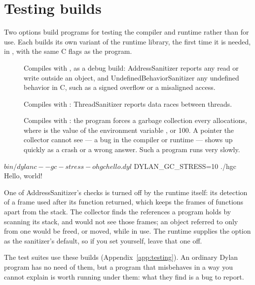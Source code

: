 \section{Testing builds}\label{sec:dylanc-testing-builds}

Two options build programs for testing the compiler and runtime rather
than for use. Each builds its own variant of the runtime library, the
first time it is needed, in ,
with the same C flags as the program.

\begin{description}
\item[] Compiles with , as a
  debug build: AddressSanitizer reports any read or write outside an
  object, and UndefinedBehaviorSanitizer any undefined behavior in C,
  such as a signed overflow or a misaligned access.
\item[] Compiles with : ThreadSanitizer reports data races
  between threads.
\item[] Compiles with :
  the program forces a garbage collection every  allocations,
  where  is the value of the environment variable
  , or 100. A pointer the collector cannot see
  --- a bug in the compiler or runtime --- shows up quickly as a crash or
  a wrong answer. Such a program runs very slowly.
\end{description}

\begin{shell}
$ bin/dylanc --gc-stress -o hgc hello.dyl
$ DYLAN_GC_STRESS=10 ./hgc
Hello, world!
\end{shell}

One of AddressSanitizer's checks is turned off by the runtime itself: its
detection of a frame used after its function returned, which keeps the
frames of functions apart from the stack. The collector finds the
references a program holds by scanning its stack, and would not see those
frames; an object referred to only from one would be freed, or moved,
while in use. The runtime supplies the option
 as the sanitizer's default,
so if you set  yourself, leave that one off.

The test suites use these builds (Appendix~\ref{app:testing}). An
ordinary Dylan program has no need of them, but a program that misbehaves
in a way you cannot explain is worth running under them: what they find
is a bug to report.

